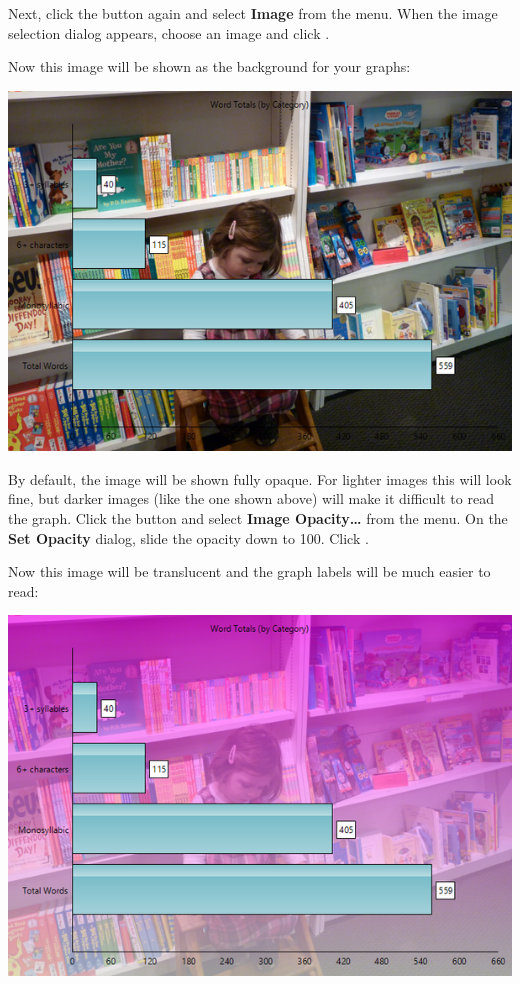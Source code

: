 \documentclass[
]{book}
\theoremstyle{definition}
\theoremstyle{definition}
\theoremstyle{definition}
\theoremstyle{definition}
\theoremstyle{remark}
\begin{document}
Next, click the  button again and select \textbf{Image} from the menu. When the image selection dialog appears, choose an image and click .

Now this image will be shown as the background for your graphs:

\begin{center}\includegraphics[width=0.75\linewidth,]{Images/ExampleGraphBackgroundImageChangedTooOpaque} \end{center}

By default, the image will be shown fully opaque. For lighter images this will look fine, but darker images (like the one shown above) will make it difficult to read the graph. Click the  button and select \textbf{Image Opacity\ldots{}} from the menu. On the \textbf{Set Opacity} dialog, slide the opacity down to 100. Click .

Now this image will be translucent and the graph labels will be much easier to read:

\begin{center}\includegraphics[width=0.75\linewidth,]{Images/ExampleGraphBackgroundImageChanged} \end{center}
\end{document}
